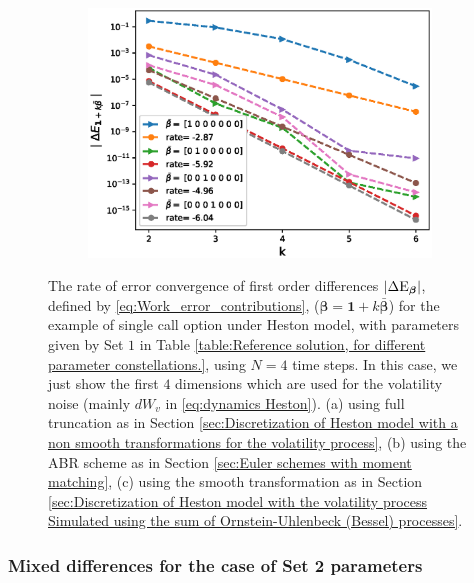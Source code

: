 \documentclass[11pt]{article}
\begin{document}
\begin{figure}[htb]
\begin{subfigure}{0.33\textwidth}
		\caption{}
		\label{fig:2}
	\end{subfigure}\hfil %
	\begin{subfigure}{0.33\textwidth}
		\includegraphics[width=\linewidth]{./figures/Heston_single_call_smooth_vol/mixed_rates/set2/N_4/first_difference_heston_4steps_spot_hierarchical_2}
		\caption{}
		\label{fig:3}
	\end{subfigure}
	\caption{The rate of error convergence of first order differences $\left\lvert\Delta \text{E}_{\boldsymbol{\beta}}\right\rvert$, defined by \eqref{eq:Work_error_contributions}, ($\boldsymbol{\beta}=\mathbf{1}+k \bar{\boldsymbol{\beta}}$) for the example of single call option under Heston model, with parameters given by Set $1$ in Table \ref{table:Reference solution, for different parameter constellations.},  using $N=4$ time steps. In this case, we just show  the first  $4$ dimensions which are used for the volatility noise (mainly $dW_v$ in \eqref{eq:dynamics Heston}). (a) using full truncation as in Section \ref{sec:Discretization of Heston model with a non smooth transformations for the volatility process}, (b) using the ABR scheme as in Section \ref{sec:Euler schemes with moment matching}, (c) using the smooth transformation as in Section \ref{sec:Discretization of Heston model with the volatility process Simulated using the sum of  Ornstein-Uhlenbeck (Bessel) processes}.}
	\label{fig:first_diff_Heston_call_N_4_set2}	
\end{figure}
\FloatBarrier


\subsubsection*{Mixed differences for the case of Set 2 parameters}
\end{document}
